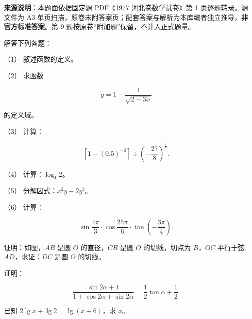 


\begin{gktip}
\textbf{来源说明}：本题面依据固定源 PDF《1977 河北卷数学试卷》第 1 页逐题转录。源文件为 A3 单页扫描，原卷未附答案页；配套答案与解析为本库编者独立推导，\textbf{非官方标准答案}。第 9 题按原卷“附加题”保留，不计入正式题量。
\end{gktip}

\par\medskip

\begin{question}
解答下列各题：

（1） 叙述函数的定义。

（2） 求函数

\nopagebreak[4]
\[
y=1-\frac1{\sqrt{2-3x}}
\]

的定义域。

（3） 计算：

\nopagebreak[4]
\[
\left[1-(0.5)^{-2}\right]\div\left(-\frac{27}{8}\right)^{\frac13}.
\]

（4） 计算：$\log_4 2$。

（5） 分解因式：$x^2y-2y^3$。

（6） 计算：

\nopagebreak[4]
\[
\sin\frac{4\pi}{3}\cdot\cos\frac{25\pi}{6}\cdot\tan\left(-\frac{3\pi}{4}\right).
\]

\Needspace{0.4\textheight}
\end{question}
\begin{question}
证明：如图，$AB$ 是圆 $O$ 的直径，$CB$ 是圆 $O$ 的切线，切点为 $B$，$OC$ 平行于弦 $AD$，求证：$DC$ 是圆 $O$ 的切线。
\nopagebreak[4]
\begin{center}\end{center}
\nopagebreak[4]
\end{question}
\begin{question}
证明：

\nopagebreak[4]
\[
\frac{\sin2\alpha+1}{1+\cos2\alpha+\sin2\alpha}=\frac12\tan\alpha+\frac12.
\]

\end{question}
\begin{question}
已知 $2\lg x+\lg2=\lg(x+6)$，求 $x$。

\Needspace{0.4\textheight}
\end{question}
